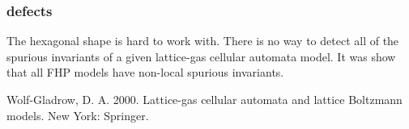 \documentclass[a4paper,12pt]{article}
\begin{document}
\subsubsection{defects}
The hexagonal shape is hard to work with.
There is no way to detect all of the spurious invariants of a given
lattice-gas cellular automata model. It was show that all FHP models
have non-local spurious invariants.
\begin{thebibliography}{9}
Wolf-Gladrow, D. A. 2000. Lattice-gas cellular automata and lattice Boltzmann models. New York: Springer.
\end{thebibliography}
\end{document}
